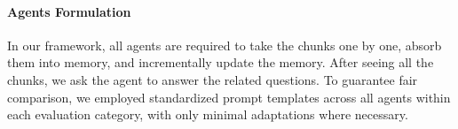 \paragraph{Agents Formulation} 
In our framework, all agents are required to take the chunks one by one, absorb them into memory, and incrementally update the memory. After seeing all the chunks, we ask the agent to answer the related questions. To guarantee fair comparison, we employed standardized prompt templates across all agents within each evaluation category, with only minimal adaptations where necessary. 



